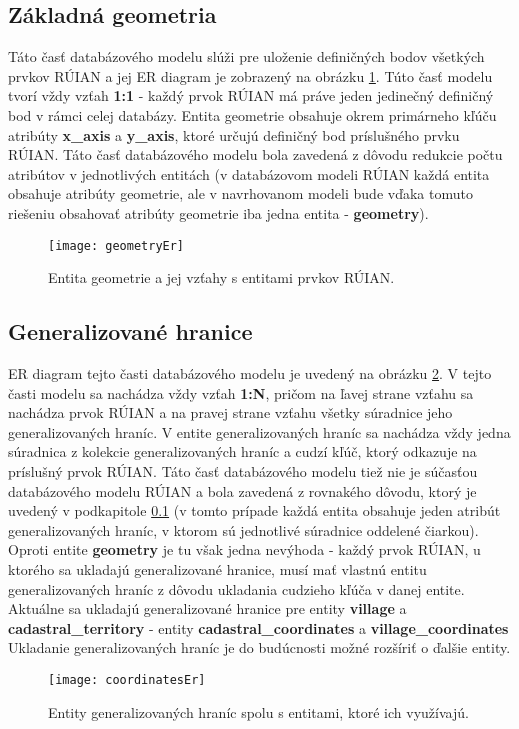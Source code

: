 \subsection {Základná geometria}
\label{basicGeometry}
Táto časť databázového modelu slúži pre uloženie definičných bodov všetkých prvkov RÚIAN a jej ER diagram je zobrazený na obrázku \ref{geometryEr}. Túto časť modelu tvorí vždy vzťah {\bf 1:1} - každý prvok RÚIAN má práve jeden jedinečný definičný bod v rámci celej databázy. Entita geometrie obsahuje okrem primárneho kľúču atribúty {\bf x\_axis} a {\bf y\_axis}, ktoré určujú definičný bod príslušného prvku RÚIAN. Táto časť databázového modelu bola zavedená z dôvodu redukcie počtu atribútov v jednotlivých entitách (v databázovom modeli RÚIAN každá entita obsahuje atribúty geometrie, ale v navrhovanom modeli bude vďaka tomuto riešeniu obsahovať atribúty geometrie iba jedna entita - {\bf geometry}).
\begin{figure}[H]
\texttt{[image: geometryEr]}
\centering
\caption{Entita geometrie a jej vzťahy s entitami prvkov RÚIAN.}
\label{geometryEr}
\end{figure}
\subsection{Generalizované hranice}
ER diagram tejto časti databázového modelu je uvedený na obrázku \ref{coordinatesEr}. V tejto časti modelu sa nachádza vždy vzťah {\bf 1:N}, pričom na ľavej strane vzťahu sa nachádza prvok RÚIAN a na pravej strane vzťahu všetky súradnice jeho generalizovaných hraníc. V entite generalizovaných hraníc sa nachádza vždy jedna súradnica z kolekcie generalizovaných hraníc a cudzí kľúč, ktorý odkazuje na príslušný prvok RÚIAN. Táto časť databázového modelu tiež nie je súčasťou databázového modelu RÚIAN a bola zavedená z rovnakého dôvodu, ktorý je uvedený v podkapitole \ref{basicGeometry} (v tomto prípade každá entita obsahuje jeden atribút generalizovaných hraníc, v ktorom sú jednotlivé súradnice oddelené čiarkou). Oproti entite {\bf geometry} je tu však jedna nevýhoda - každý prvok RÚIAN, u ktorého sa ukladajú generalizované hranice, musí mať vlastnú entitu generalizovaných hraníc z dôvodu ukladania cudzieho kľúča v danej entite. Aktuálne sa ukladajú generalizované hranice pre entity {\bf village} a {\bf cadastral\_territory} - entity {\bf cadastral\_coordinates} a {\bf village\_coordinates} Ukladanie generalizovaných hraníc je do budúcnosti možné rozšíriť o ďalšie entity.
\begin{figure}[H]
\texttt{[image: coordinatesEr]}
\centering
\caption{Entity  generalizovaných hraníc spolu s entitami, ktoré ich využívajú.}
\label{coordinatesEr}
\end{figure}
